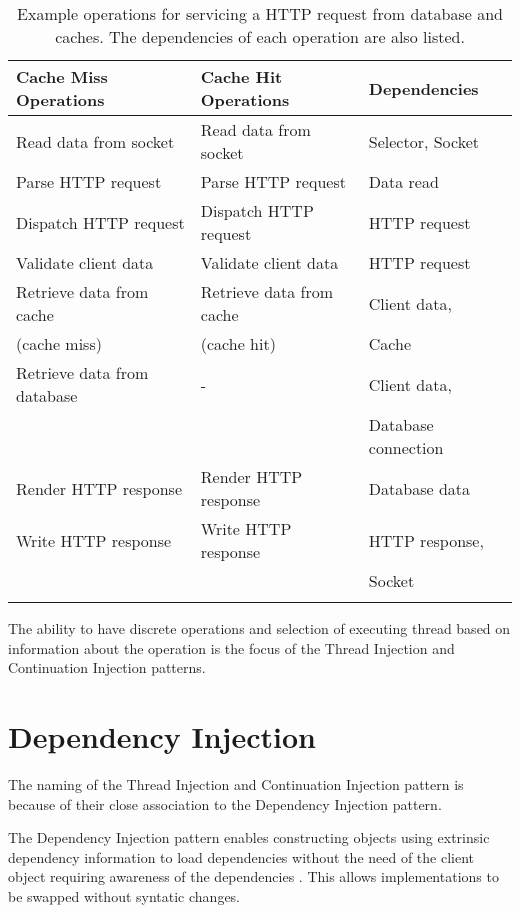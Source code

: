 \documentclass{article}
\begin{document}
\begin{table}[!t]
\renewcommand{\arraystretch}{1.3}
\centering
\begin{tabular}{l||l||l}
\hline
\bfseries Cache Miss Operations & \bfseries Cache Hit Operations & \bfseries Dependencies \\
\hline\hline
Read data from socket & Read data from socket & Selector, Socket \\
\hline
Parse HTTP request & Parse HTTP request & Data read \\
\hline
Dispatch HTTP request & Dispatch HTTP request & HTTP request \\
\hline
Validate client data & Validate client data & HTTP request \\
\hline
Retrieve data from cache & Retrieve data from cache & Client data, \\
(cache miss) & (cache hit) & Cache \\
\hline
Retrieve data from database & - & Client data, \\
 & & Database connection \\
\hline
Render HTTP response & Render HTTP response & Database data \\
\hline
Write HTTP response & Write HTTP response & HTTP response, \\ 
 & & Socket \\
\hline
\caption{Example operations for servicing a HTTP request from database and caches. The dependencies of each operation are also listed.}
\label{tab:example_request_operations}
\end{tabular}
\end{table}

The ability to have discrete operations and selection of executing thread based
on information about the operation is the focus of the Thread Injection and
Continuation Injection patterns.


\section{Dependency Injection}

The naming of the Thread Injection and Continuation Injection pattern is because
of their close association to the Dependency Injection pattern.

The Dependency Injection pattern enables constructing objects using extrinsic
dependency information to load dependencies without the need of the client
object requiring awareness of the dependencies \cite{ioc}.  This allows
implementations to be swapped without syntatic changes.
\end{document}
